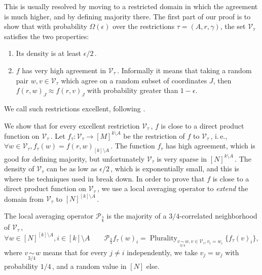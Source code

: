 \documentclass[11pt]{article}
\numberwithin{equation}{section}
\theoremstyle{definition}
\theoremstyle{plain}
\newcommand{\ie}{i.\,e.}
\newcommand\f{f} %
\newcommand\cons{\mathcal{V}} %
\newcommand\cor[1]{\underset{\scriptscriptstyle#1}{\sim}} %
\DeclareMathOperator*\plur{\mathrm{Plurality}} %
\begin{document}
This is usually resolved by moving to a restricted domain in which the agreement is much higher, and by defining majority there. The first part of our proof is to show that with probability $\Omega(\epsilon)$ over the restrictions $\tau=(A,r,\gamma)$, the set $\cons_\tau$ satisfies the two properties:
\begin{enumerate}
	\item Its density is at least 
	${\epsilon}/{2}$\,. %
	\item $\f$ has very high agreement in $\cons_\tau$\,. Informally it means that taking a random pair $w,v\in \cons_\tau$ which agree on a random subset of coordinates $J$, then $\f(r,w)_J\approx\f(r,v)_J$ with probability greater than $1-\epsilon$.
\end{enumerate}
We call such restrictions excellent, following \cite{impagliazzo2012new}.

We show that for every excellent restriction $\cons_\tau$\,, $\f$ is close to a direct product function on $\cons_\tau$\,. Let $f_\tau:\cons_{\tau}\rightarrow[M]^{k\setminus A}$ be the restriction of $\f$ to $\cons_\tau$\,, \ie, $\forall w\in \cons_{\tau},\f_{\tau}(w) = \f(r,w)_{[k]\setminus A}$\,.
The function $f_\tau$ has high agreement, which is good for defining majority, but unfortunately $\cons_\tau$ is very sparse in $[N]^{k\setminus A}$\,. The density of $\cons_{\tau}$ can be as low as 
%
${\epsilon}/{2}$\,, %
which is exponentially small, and this is where the techniques used in \cite{impagliazzo2012new} break down. In order to prove that $\f$ is close to a direct product function on $\cons_{\tau}$\,, we use a local averaging operator to \emph{extend} the domain from $\cons_\tau$ to $[N]^{[k]\setminus A}$\,.

The local averaging operator $\mathcal{P}_\frac{3}{4}$ is the majority of a 
%
%
%
$3/4$-correlated  %
neighborhood of $\cons_\tau$\,,
\[ \forall w\in [N]^{[k]\setminus A},i\in [k]\setminus A \qquad \mathcal{P}_\frac{3}{4}f_\tau (w)_i = \plur_{v\cor{3/4}w, v\in\cons_\tau,v_i=w_i}\{f_\tau(v)_i \}, \]
where $v\cor{3/4}{w}$ means that for every $j\neq i$ independently, we take $v_j=w_j$ with probability 
%
$1/4$\,, %
and a random value in $[N]$ else.
\end{document}

